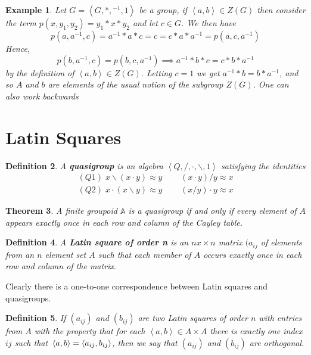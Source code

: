 \documentclass[12pt,a4paper]{article}
\newtheorem{theorem}{Theorem}[section]
\newtheorem{example}[theorem]{Example}
\newtheorem{definition}[theorem]{Definition}
\begin{document}
\begin{example}
Let $G=\left<G,*,{}^{-1},1\right>$ be a group, if $ \left<a,b\right> \in Z(G)$ then consider the term $p(x,y_1,y_2)=y_1*x*y_2$ and let $c\in G$. We then have
$$p(a,a^{-1},c)=a^{-1}*a*c=c=c*a*a^{-1}=p(a,c,a^{-1})$$
Hence, 
\[
p(b,a^{-1},c)=p(b,c,a^{-1})\implies a^{-1}*b*c=c*b*a^{-1} 
\]
by the definition of $ \left<a,b\right> \in Z(G)$.
Letting $c=1$ we get $a^{-1}*b=b*a^{-1}$, and so $A$ and $b$ are elements of the usual notion of the subgroup $Z(G)$.
One can also work backwards
\end{example}

\section{Latin Squares}

\begin{definition}
    A \textbf{quasigroup} is an algebra $\left<Q,/,\cdot,\backslash,1\right>$ satisfying the identities
    \begin{align*}
        (Q1)\; x\backslash (x\cdot y)\approx y\;\;\;\;\; & (x\cdot y)/y\approx x\\
        (Q2)\; x\cdot(x\backslash y)\approx y \;\;\;\;\;& (x/y)\cdot y\approx x
    \end{align*}
\end{definition}

\begin{theorem}
A finite groupoid $\mathbb{A}$ is a quasigroup if and only if every element of $A$ appears exactly once in each row and column of the Cayley table.
\end{theorem}

\begin{definition}
    A \textbf{Latin square of order n} is an $nx\times n$ matrix $(a_{ij}$ of elements from an $n$ element set $A$ such that each member of $A$ occurs exactly once in each row and column of the matrix.
\end{definition}

Clearly there is a one-to-one correspondence between Latin squares and quasigroups.

\begin{definition}
    If $(a_{ij})$ and $(b_{ij})$ are two Latin squares of order $n$ with entries from $A$ with the property that for each $ \left<a,b\right> \in A\times A$ there is exactly one index $ij$ such that $\\ \left<a,b\right> =\left<a_{ij},b_{ij}\right>$, then we say that $(a_{ij})$ and $(b_{ij})$ are orthogonal.
\end{definition}
\end{document}
